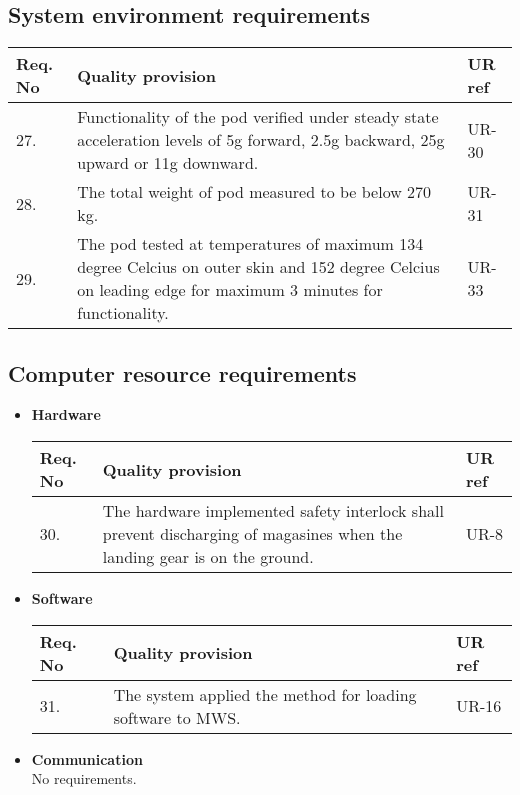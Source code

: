 \subsection{System environment requirements}
\begin{center}
   	\begin{tabular}{ | l | p{9cm} | l |}
    \hline
    Req. No & Quality provision  & UR ref \\ \hline
27. & Functionality of the pod verified under steady state acceleration levels of 5g forward, 2.5g backward, 25g upward or 11g downward.&UR-30\\ \hline
	28. &The total weight of pod measured to be below 270 kg.&UR-31\\ \hline
	29. &The pod tested at temperatures of maximum 134 degree Celcius on outer skin and 152 degree Celcius on leading edge for maximum 3 minutes for functionality.&UR-33\\	 
\hline
    \end{tabular}
\end{center}

\subsection{Computer resource requirements}
\begin{itemize}
\item \textbf{Hardware}
 	\begin{center}
   	\begin{tabular}{ | l | p{9cm} | l |}
    \hline
    Req. No & Quality provision  & UR ref \\ \hline
    30. &The hardware implemented safety interlock shall prevent discharging of magasines when the landing gear is on the ground.
 &UR-8\\
    \hline
    \end{tabular}
	\end{center}
\item \textbf{Software}
 	\begin{center}
   	\begin{tabular}{ | l | p{9cm} | l |}
    \hline
    Req. No & Quality provision  & UR ref \\ \hline
    31. &The system applied the method for loading software to MWS. &UR-16\\
    \hline
    \end{tabular}
	\end{center}
\item \textbf{Communication}\\
No requirements.
\end{itemize}

